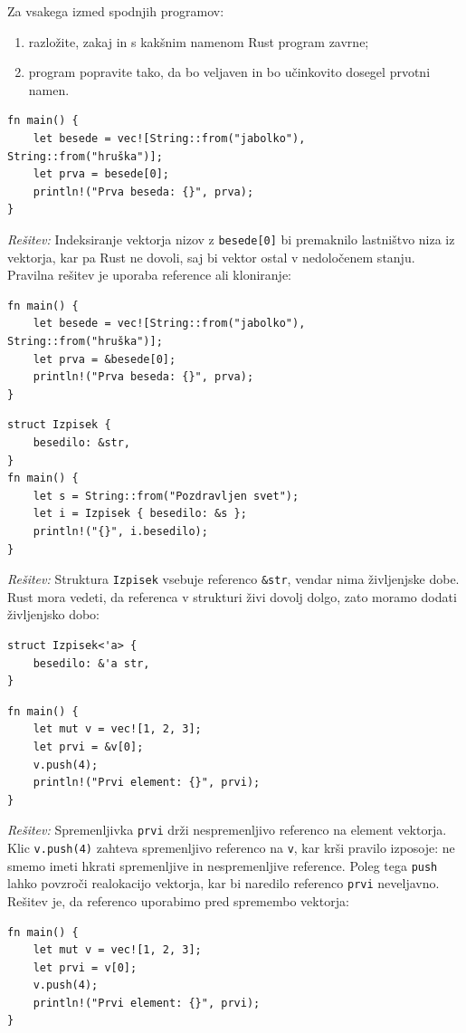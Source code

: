 \documentclass[arhiv]{../izpit}
\begin{document}
\naloga[\tocke{20}]
Za vsakega izmed spodnjih programov:
\begin{enumerate}
  \item razložite, zakaj in s kakšnim namenom Rust program zavrne;
  \item program popravite tako, da bo veljaven in bo učinkovito dosegel prvotni namen.
\end{enumerate}

\podnaloga
\begin{verbatim}
fn main() {
    let besede = vec![String::from("jabolko"), String::from("hruška")];
    let prva = besede[0];
    println!("Prva beseda: {}", prva);
}
\end{verbatim}

\noindent
\emph{Rešitev:} Indeksiranje vektorja nizov z \texttt{besede[0]} bi premaknilo lastništvo niza iz vektorja, kar pa Rust ne dovoli, saj bi vektor ostal v nedoločenem stanju. Pravilna rešitev je uporaba reference ali kloniranje:
\begin{verbatim}
fn main() {
    let besede = vec![String::from("jabolko"), String::from("hruška")];
    let prva = &besede[0];
    println!("Prva beseda: {}", prva);
}
\end{verbatim}

\podnaloga
\begin{verbatim}
struct Izpisek {
    besedilo: &str,
}
fn main() {
    let s = String::from("Pozdravljen svet");
    let i = Izpisek { besedilo: &s };
    println!("{}", i.besedilo);
}
\end{verbatim}

\noindent
\emph{Rešitev:} Struktura \texttt{Izpisek} vsebuje referenco \texttt{&str}, vendar nima življenjske dobe. Rust mora vedeti, da referenca v strukturi živi dovolj dolgo, zato moramo dodati življenjsko dobo:
\begin{verbatim}
struct Izpisek<'a> {
    besedilo: &'a str,
}
\end{verbatim}

\podnaloga
\begin{verbatim}
fn main() {
    let mut v = vec![1, 2, 3];
    let prvi = &v[0];
    v.push(4);
    println!("Prvi element: {}", prvi);
}
\end{verbatim}

\noindent
\emph{Rešitev:} Spremenljivka \texttt{prvi} drži nespremenljivo referenco na element vektorja. Klic \texttt{v.push(4)} zahteva spremenljivo referenco na \texttt{v}, kar krši pravilo izposoje: ne smemo imeti hkrati spremenljive in nespremenljive reference. Poleg tega \texttt{push} lahko povzroči realokacijo vektorja, kar bi naredilo referenco \texttt{prvi} neveljavno. Rešitev je, da referenco uporabimo pred spremembo vektorja:
\begin{verbatim}
fn main() {
    let mut v = vec![1, 2, 3];
    let prvi = v[0];
    v.push(4);
    println!("Prvi element: {}", prvi);
}
\end{verbatim}
\end{document}
